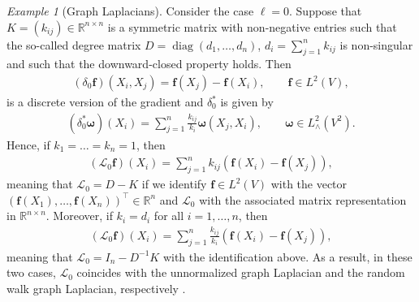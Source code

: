 \documentclass[10pt]{article}
\theoremstyle{plain}
\theoremstyle{definition}
\theoremstyle{remark}
\newtheorem{example}{Example}
\begin{document}
    \begin{example}[Graph Laplacians]
        \label{ex.graph.laplacian}
        Consider the case $\ell=0$. Suppose that $K=(k_{ij})\in\mathbb{R}^{n\times n}$ is a symmetric matrix with non-negative entries such that the so-called degree matrix $D=\operatorname{diag}(d_1,\dots,d_n)$, $d_i=\sum_{j=1}^nk_{ij}$ is non-singular and such that the downward-closed property holds. Then 
        \begin{align*}
            (\delta_0\mathbf{f})(X_i,X_j)=\mathbf{f}(X_j)-\mathbf{f}(X_i),\qquad \mathbf{f}\in L^2(V),
        \end{align*}
        is a discrete version of the gradient and $\delta_0^*$ is given by
        \begin{align*}
            (\delta_0^*\boldsymbol{\omega})(X_i)=\sum_{j=1}^n\frac{k_{ij}}{k_i}\boldsymbol{\omega}(X_j,X_i),\qquad \boldsymbol{\omega}\in L_\wedge^2(V^2).
        \end{align*}
        Hence, if $k_1=\dots=k_n = 1$, then
        \begin{align*}
            (\mathscr{L}_0\mathbf{f})(X_i)=\sum_{j=1}^nk_{ij}(\mathbf{f}(X_i)-\mathbf{f}(X_j)),
        \end{align*}
        meaning that $\mathscr{L}_0=D-K$ if we identify $\mathbf{f}\in L^2(V)$ with the vector $(\mathbf{f}(X_1),\dots,\mathbf{f}(X_n))^\top\in\mathbb{R}^n$ and $\mathscr{L}_0$ with the associated matrix representation in $\mathbb{R}^{n\times n}$. Moreover, if $k_i=d_i$ for all $i=1,\dots,n$, then 
        \begin{align*}
            (\mathscr{L}_0\mathbf{f})(X_i)=\sum_{j=1}^n\frac{k_{ij}}{k_i}(\mathbf{f}(X_i)-\mathbf{f}(X_j)),
        \end{align*}
        meaning that $\mathscr{L}_0=I_n-D^{-1}K$ with the identification above. As a result, in these two cases, $\mathscr{L}_0$ coincides with the unnormalized graph Laplacian and the random walk graph Laplacian, respectively \cite{Chung97,vLux07}.
    \end{example}
\end{document}
